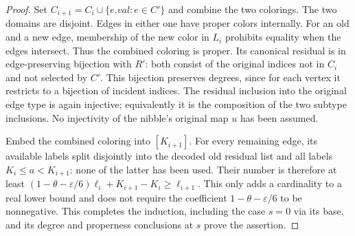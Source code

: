 \begin{proof}
Set $C_{i+1}=C_i\cup\{e.val:e\in C'\}$ and combine the two colorings.
The two domains are disjoint. Edges in either one have proper colors
internally. For an old and a new edge, membership of the new color in
$L_i$ prohibits equality when the edges intersect. Thus the combined
coloring is proper. Its canonical residual is in edge-preserving
bijection with $R'$: both consist of the original indices not in $C_i$
and not selected by $C'$. This bijection preserves degrees, since for
each vertex it restricts to a bijection of incident indices.
The residual inclusion into the original edge type is again injective;
equivalently it is the composition of the two subtype inclusions. No
injectivity of the nibble's original map $u$ has been assumed.

Embed the combined coloring into $[K_{i+1}]$. For every remaining edge,
its available labels split disjointly into the decoded old residual list
and all labels $K_i\le a<K_{i+1}$: none of the latter has been used.
Their number is therefore at least
$(1-\theta-\varepsilon/6)\ell_i+K_{i+1}-K_i\ge\ell_{i+1}$.
This only adds a cardinality to a real lower bound and does not require
the coefficient $1-\theta-\varepsilon/6$ to be nonnegative.
This completes the induction, including the case $s=0$ via its base,
and its degree and properness conclusions at $s$ prove the assertion.
\end{proof}
